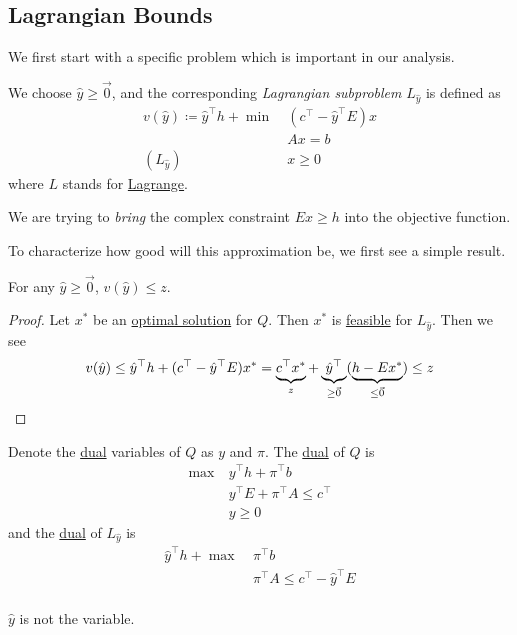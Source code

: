 \subsection{Lagrangian Bounds}
We first start with a specific problem which is important in our analysis.
\begin{definition}\label{def:Lagrangian-subproblem}
	We choose \(\hat{y}\geq \vec{0}\), and the corresponding \emph{Lagrangian subproblem} \(L_{\hat{y}}\) is defined as
	\[
		\begin{aligned}
			v(\hat{y})\coloneqq \hat{y}^{\top}h + \min~ & (c^{\top} - \hat{y}^{\top}E)x \\
			                                            & Ax = b                        \\
			(L_{\hat{y}})\quad                          & x\geq 0
		\end{aligned}
	\]
	where \(L\) stands for \href{https://en.wikipedia.org/wiki/Joseph-Louis_Lagrange}{Lagrange}.
\end{definition}

\begin{intuition}
	We are trying to \emph{bring} the complex constraint \(Ex\geq h\) into the objective function.
\end{intuition}

To characterize how good will this approximation be, we first see a simple result.
\begin{lemma}\label{lma:lec18-1}
	For any \(\hat{y}\geq \vec{0}\), \(v(\hat{y})\leq z\).
\end{lemma}
\begin{proof}
	Let \(x^{\ast}\) be an \hyperref[def:optimal-solution]{optimal solution} for \(Q\). Then \(x^{\ast}\) is \hyperref[def:feasible-solution]{feasible} for \(L_{\hat{y}}\).
	Then we see
	\[
		v(\hat{y}) \leq \hat{y}^{\top}h + (c^{\top} - \hat{y}^{\top} E )x^{\ast}
		= \underbrace{\vphantom{\hat{y}^{\top}}c^{\top}x^{\ast}}_{z} + \underbrace{\hat{y}^{\top}}_{\geq \vec{0}}(\underbrace{\vphantom{\hat{y}^{\top}}h - Ex^{\ast}}_{\leq \vec{0}})
		\leq z
	\]
\end{proof}

Denote the \hyperref[def:dual]{dual} variables of \(Q\) as \(y\) and \(\pi\). The \hyperref[def:dual]{dual} of \(Q\) is
\[
	\begin{aligned}
		\max~ & y^{\top}h + \pi^{\top} b             \\
		      & y^{\top}E + \pi^{\top}A\leq c^{\top} \\
		      & y\geq 0
	\end{aligned}
\]
and the \hyperref[def:dual]{dual} of \(L_{\hat{y}}\) is
\[
	\begin{aligned}
		\hat{y}^{\top}h + \max~ & \pi^{\top}b                                \\
		                        & \pi^{\top}A\leq c^{\top} - \hat{y}^{\top}E \\
	\end{aligned}
\]
\begin{note}
	\(\hat{y}\) is not the variable.
\end{note}

